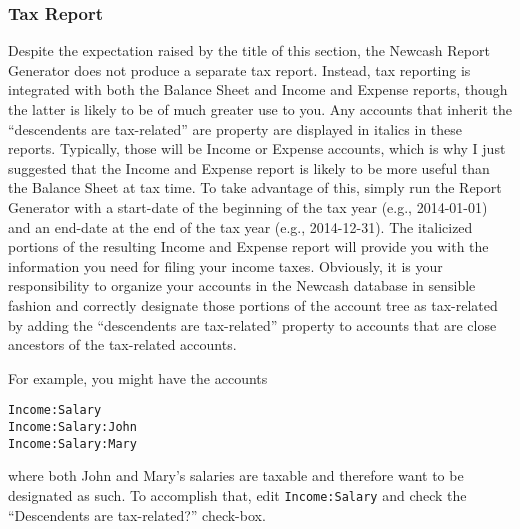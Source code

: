 \documentclass{report}
\begin{document}
\subsubsection{Tax Report}
Despite the expectation raised by the title of this section, the Newcash Report Generator does not produce a separate tax report. Instead, tax reporting is integrated with both the Balance Sheet and Income and Expense reports, though the latter is likely to be of 
much greater use to you. Any accounts that inherit the ``descendents are tax-related'' are property are displayed in italics in these reports. Typically, those will be Income or Expense accounts, which is why I just suggested that the Income and Expense report is likely to be more useful than the Balance Sheet at tax time. To take advantage of this, simply run the Report Generator with a start-date of the beginning of the tax year (e.g., 2014-01-01) and an end-date at the end of the tax year (e.g., 2014-12-31). The italicized portions of the resulting Income and Expense report will provide you with the information you need for filing your income taxes. Obviously, it is your responsibility to organize your accounts in the Newcash database in sensible fashion and correctly designate those portions of the account tree as tax-related by adding the ``descendents are tax-related'' property to accounts that are close ancestors of the tax-related accounts.

For example, you might have the accounts
\begin{verbatim}
Income:Salary
Income:Salary:John
Income:Salary:Mary
\end{verbatim}
where both John and Mary's salaries are taxable and therefore want to be designated as such. To accomplish that, edit \verb|Income:Salary| and check the ``Descendents are tax-related?'' check-box.
\end{document}

